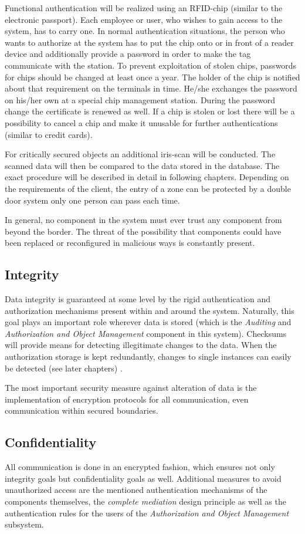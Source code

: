 \documentclass[12pt,a4paper,titlepage,oneside]{scrartcl}
\begin{document}
Functional authentication will be realized using an RFID-chip (similar to the electronic passport). Each employee or user, who wishes to gain access to the system, has to carry one. In normal authentication situations, the person who wants to authorize at the system has to put the chip onto or in front of a reader device and additionally provide a password in order to make the tag communicate with the station. To prevent exploitation of stolen chips, passwords for chips should be changed at least once a year. The holder of the chip is notified about that requirement  on the terminals in time. He/she exchanges the password on his/her own at a special chip management station. During the password change the certificate is renewed as well. If a chip is stolen or lost there will be a possibility to cancel a chip and make it unusable for further authentications (similar to credit cards).

For critically secured objects an additional iris-scan will be conducted. The scanned data will then be compared to the data stored in the database. The exact procedure will be described in detail in following chapters. Depending on the requirements of the client, the entry of a zone can be protected by a double door system only one person can pass each time.

In general, no component in the system must ever trust any component from beyond the border. The threat of the possibility that components could have been replaced or reconfigured in malicious ways is constantly present.

\subsection{Integrity}
Data integrity is guaranteed at some level by the rigid authentication and authorization mechanisms present within and around the system. Naturally, this goal plays an important role wherever data is stored (which is the \emph{Auditing} and \emph{Authorization and Object Management} component in this system). Checksums will provide means for detecting illegitimate changes to the data. When the authorization storage is kept redundantly, changes to single instances can easily be detected  (see later chapters) .

The most important security measure against alteration of data is the implementation of encryption protocols for all communication, even communication within secured boundaries.

\subsection{Confidentiality}
All communication is done in an encrypted fashion, which ensures not only integrity goals but confidentiality goals as well. Additional measures to avoid unauthorized access are the mentioned authentication mechanisms of the components themselves, the \emph{complete mediation} design principle as well as the authentication rules for the users of the \emph{Authorization and Object Management} subsystem.
\end{document}
